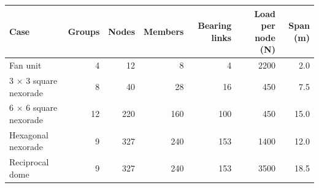 \begin{tabular}{lrrrrrr}
\toprule
Case & Groups & Nodes & Members & Bearing links & Load per node (N) & Span (m) \\
\midrule
Fan unit & 4 & 12 & 8 & 4 & 2200 & 2.0 \\
3 $\times$ 3 square nexorade & 8 & 40 & 28 & 16 & 450 & 7.5 \\
6 $\times$ 6 square nexorade & 12 & 220 & 160 & 100 & 450 & 15.0 \\
Hexagonal nexorade & 9 & 327 & 240 & 153 & 1400 & 12.0 \\
Reciprocal dome & 9 & 327 & 240 & 153 & 3500 & 18.5 \\
\bottomrule
\end{tabular}